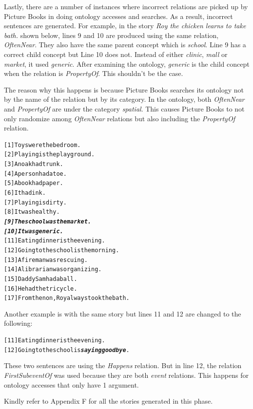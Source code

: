 Lastly, there are a number of instances where incorrect relations are picked up by Picture Books in doing ontology accesses and searches. As a result, incorrect sentences are generated. For example, in the story \textit{Roy the chicken learns to take bath.} shown below, lines 9 and 10 are produced using the same relation, \textit{OftenNear}. They also have the same parent concept which is \textit{school}. Line 9 has a correct child concept but Line 10 does not. Instead of either \textit{clinic}, \textit{mall} or \textit{market}, it used \textit{generic}. After examining the ontology, \textit{generic} is the child concept when the relation is \textit{PropertyOf}. This shouldn't be the case. 

The reason why this happens is because Picture Books searches its ontology not by the name of the relation but by its category. In the ontology, both \textit{OftenNear} and \textit{PropertyOf} are under the category \textit{spatial}. This causes Picture Books to not only randomize among \textit{OftenNear} relations but also including the \textit{PropertyOf} relation.

\begin{alltt}
[1]  Toys were the bedroom.
[2]  Playing is the playground.
[3]  An oak had trunk.
[4]  A person had a toe.
[5]  A book had paper.
[6]  It had ink.
[7]  Playing is dirty.
[8]  It was healthy.
\emph{\textbf{[9]  The school was the market.}}
\emph{\textbf{[10] It was generic.}}
[11] Eating dinner is the evening.
[12] Going to the school is the morning.
[13] A fireman was rescuing.
[14] A librarian was organizing.
[15] Daddy Sam had a ball.
[16] He had the tricycle.
[17] From then on, Roy always took the bath.
\end{alltt}

Another example is with the same story but lines 11 and 12 are changed to the following:

\begin{alltt}
[11] Eating dinner is the evening.
[12] Going to the school is \emph{\textbf{saying goodbye}}.
\end{alltt}

These two sentences are using the \textit{Happens} relation. But in line 12, the relation \textit{FirstSubeventOf} was used because they are both \textit{event} relations. This happens for ontology accesses that only have 1 argument.

Kindly refer to Appendix F for all the stories generated in this phase.









